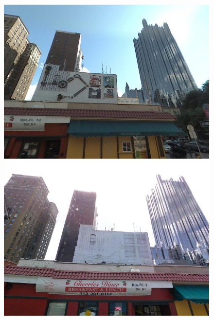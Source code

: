 \begin{figure}[!ht]
{\begin{minipage}{\subw}
		  \centerline{
		  \includegraphics[width=1.05\linewidth]{imgs/demo01.jpg}
		  }
		\end{minipage}
	 }
	 \hspace{3mm}
	 \colorbox{myGreen}{
		\begin{minipage}{\subw}
		  \centerline{
		  \includegraphics[width=1.05\linewidth]{imgs/demo02.jpg}
		  }
		\end{minipage}
	 }
	 \colorbox{myRed}{
		\begin{minipage}{\subw}
		  \centerline{
}
\end{minipage}}
\end{figure}
